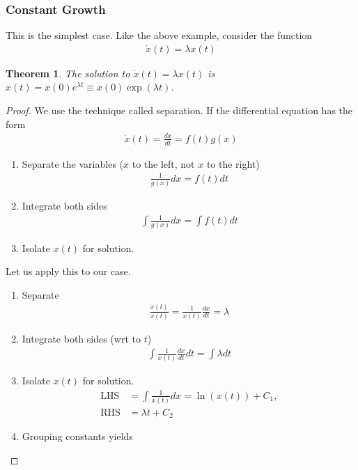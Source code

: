 \documentclass[11pt,a4paper]{book}
\newtheorem{theorem}{Theorem}[section]
\theoremstyle{definition}\newtheorem{definition}{Definition}
\theoremstyle{definition}\newtheorem{fact}{Fact}
\theoremstyle{definition}\newtheorem{remark}{Remark}
\theoremstyle{definition}\newtheorem{ex}{Ex.}
\theoremstyle{definition}\newtheorem{project}{Project}
\theoremstyle{definition}\newtheorem{problem}{Problem}
\theoremstyle{definition}\newtheorem{example}{Example}
\numberwithin{theorem}{section}
\numberwithin{corollary}{chapter}
\numberwithin{assumption}{chapter}
\numberwithin{definition}{chapter}
\numberwithin{prop}{chapter}
\numberwithin{notation}{chapter}
\numberwithin{problem}{chapter}
\numberwithin{example}{chapter}
\numberwithin{fact}{chapter}
\numberwithin{ex}{chapter}
\begin{document}
	\subsubsection{Constant Growth}
	This is the simplest case. Like the above example, consider the function
	\begin{align}
		\dot{x}(t) = \lambda x(t) \label{auto1}
	\end{align}
	\begin{theorem}
		The solution to $\dot{x}(t) = \lambda x(t)$ is $x(t) = x(0) e^{\lambda t} \equiv x(0) \exp(\lambda t)$.
	\end{theorem}
	\begin{proof}
		We use the technique called separation. If the differential equation has the form
		\begin{align*}
			\dot{x}(t) = \frac{dx}{dt} =  f(t) g(x)
		\end{align*}
		\begin{enumerate}
			\item Separate the variables ($x$ to the left, not $x$ to the right)
			\begin{align*}
				\frac{1}{g(x)} dx = f(t) dt
			\end{align*}
			\item Integrate both sides
			\begin{align*}
				\int \frac{1}{g(x)} dx = \int f(t) dt
			\end{align*}
			\item Isolate $x(t)$ for solution.
		\end{enumerate}
		Let us apply this to our case. 
		\begin{enumerate}
			\item Separate 
			\begin{align*}
				\frac{\dot{x}(t)}{x(t)} = \frac{1}{x(t)}\frac{dx}{dt} = \lambda 
			\end{align*}
			\item Integrate both sides (wrt to $t$)
			\begin{align*}
				\int \frac{1}{x(t)}\frac{dx}{dt} dt = \int \lambda  dt
			\end{align*}
			\item Isolate $x(t)$ for solution.
			\begin{align*}
				\text{LHS} &= \int \frac{1}{x(t)} dx = \ln(x(t)) + C_1, \\
				\text{RHS} &= \lambda t + C_2
			\end{align*}
			\item Grouping constants yields

\end{enumerate}
\end{proof}
\end{document}
